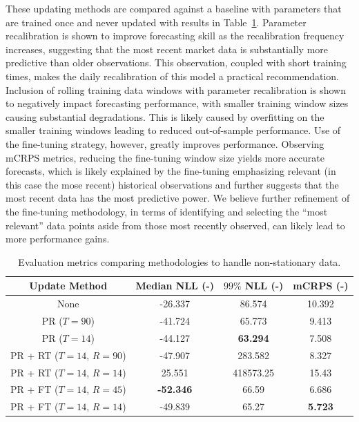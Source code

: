 These updating methods are compared against a baseline with parameters that are trained once and never updated with
results in Table~\ref{tab:nonstat}.
Parameter recalibration is shown to improve forecasting skill as the recalibration frequency increases, suggesting that
the most recent market data is substantially more predictive than older observations.
This observation, coupled with short training times, makes the daily recalibration of this model a practical
recommendation.
Inclusion of rolling training data windows with parameter recalibration is shown to negatively impact forecasting
performance, with smaller training window sizes causing substantial degradations.
This is likely caused by overfitting on the smaller training windows leading to reduced out-of-sample performance.
Use of the fine-tuning strategy, however, greatly improves performance.
Observing mCRPS metrics, reducing the fine-tuning window size yields more accurate forecasts, which is likely explained
by the fine-tuning emphasizing relevant (in this case the mose recent) historical observations and further
suggests that the most recent data has the most predictive power.
We believe further refinement of the fine-tuning methodology, in terms of identifying and selecting the ``most
relevant'' data points aside from those most recently observed, can likely lead to more performance gains.

\begin{table}[htb]
    \caption[Comparison of strategies for handling non-stationary data]{
        Evaluation metrics comparing methodologies to handle non-stationary data.
    }
    \begin{center}
        \begin{tabular}{||c|c|c|c||} \hline
        Update Method & Median NLL (-)  & $99\%$ NLL (-) & mCRPS (-)  \\	%
        \hline \hline
        None                         &         -26.337  &         86.574  &        10.392  \\ \hline
        PR ($T = 90$)                &         -41.724  &         65.773  &         9.413  \\
        PR ($T = 14$)                &         -44.127  & \textbf{63.294} &         7.508  \\ \hline
        PR + RT ($T = 14$, $R = 90$) &         -47.907  &        283.582  &         8.327  \\
        PR + RT ($T = 14$, $R = 14$) &          25.551  &     418573.25   &        15.43   \\ \hline
        PR + FT ($T = 14$, $R = 45$) & \textbf{-52.346} &         66.59   &         6.686  \\
        PR + FT ($T = 14$, $R = 14$) &         -49.839  &         65.27   & \textbf{5.723} \\ \hline
        \end{tabular}
        \\ \rule{0mm}{5mm}
    \end{center}
    \label{tab:nonstat}
\end{table}

